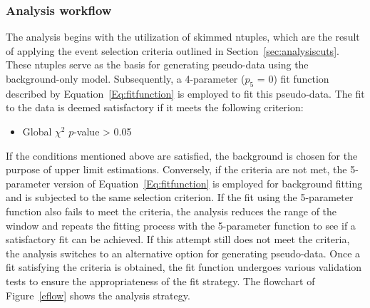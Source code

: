 
\subsubsection{Analysis workflow}

The analysis begins with the utilization of skimmed ntuples, which are the result of applying the event selection criteria outlined in Section~\ref{sec:analysiscuts}. These ntuples serve as the basis for generating pseudo-data using the background-only model. Subsequently, a 4-parameter ($p_5$ = 0) fit function described by Equation~\ref{Eq:fitfunction} is employed to fit this pseudo-data. The fit to the data is deemed satisfactory if it meets the following criterion:

\begin{itemize}
	\item Global $\chi^2$ $p$-value > 0.05
\end{itemize}

If the conditions mentioned above are satisfied, the background is chosen for the purpose of upper limit estimations. Conversely, if the criteria are not met, the 5-parameter version of Equation~\ref{Eq:fitfunction} is employed for background fitting and is subjected to the same selection criterion. If the fit using the 5-parameter function also fails to meet the criteria, the analysis reduces the range of the window and repeats the fitting process with the 5-parameter function to see if a satisfactory fit can be achieved. If this attempt still does not meet the criteria, the analysis switches to an alternative option for generating pseudo-data. Once a fit satisfying the criteria is obtained, the fit function undergoes various validation tests to ensure the appropriateness of the fit strategy. The flowchart of Figure~\ref{eflow} shows the analysis strategy.

